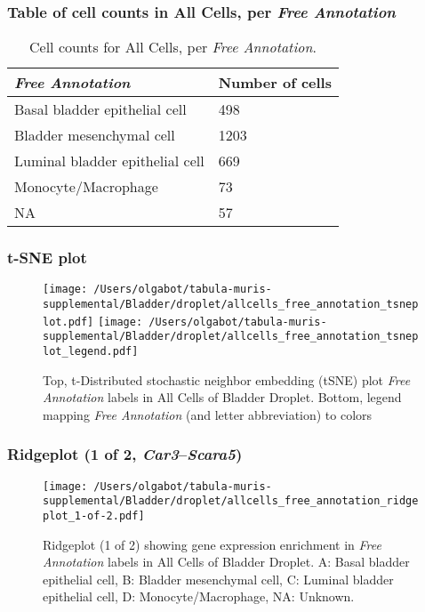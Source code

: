 \subsubsection{Table of cell counts in All Cells, per \emph{Free Annotation}}\begin{table}[h]
\centering
\label{my-label}
\begin{tabular}{@{}ll@{}}
\toprule

\emph{Free Annotation}& Number of cells \\ \midrule
Basal bladder epithelial cell & 498 \\

Bladder mesenchymal cell & 1203 \\

Luminal bladder epithelial cell & 669 \\

Monocyte/Macrophage & 73 \\

NA & 57 \\
\bottomrule
\end{tabular}
\caption{Cell counts for All Cells, per \emph{Free Annotation}.}
\end{table}

\clearpage
\subsubsection{t-SNE plot}
\begin{figure}[h]
\centering
\texttt{[image: /Users/olgabot/tabula-muris-supplemental/Bladder/droplet/allcells\_free\_annotation\_tsneplot.pdf]}
\texttt{[image: /Users/olgabot/tabula-muris-supplemental/Bladder/droplet/allcells\_free\_annotation\_tsneplot\_legend.pdf]}
\caption{Top, t-Distributed stochastic neighbor embedding (tSNE) plot  \emph{Free Annotation} labels in All Cells of Bladder Droplet. Bottom, legend mapping \emph{Free Annotation} (and letter abbreviation) to colors}
\end{figure}


\clearpage

\subsubsection{Ridgeplot (1 of 2, \emph{Car3}--\emph{Scara5})}
\begin{figure}[h]
\centering
\texttt{[image: /Users/olgabot/tabula-muris-supplemental/Bladder/droplet/allcells\_free\_annotation\_ridgeplot\_1-of-2.pdf]}

\caption{ Ridgeplot (1 of 2)  showing gene expression enrichment in \emph{Free Annotation} labels in All Cells of Bladder Droplet. A: Basal bladder epithelial cell, B: Bladder mesenchymal cell, C: Luminal bladder epithelial cell, D: Monocyte/Macrophage, NA: Unknown.}
\end{figure}


